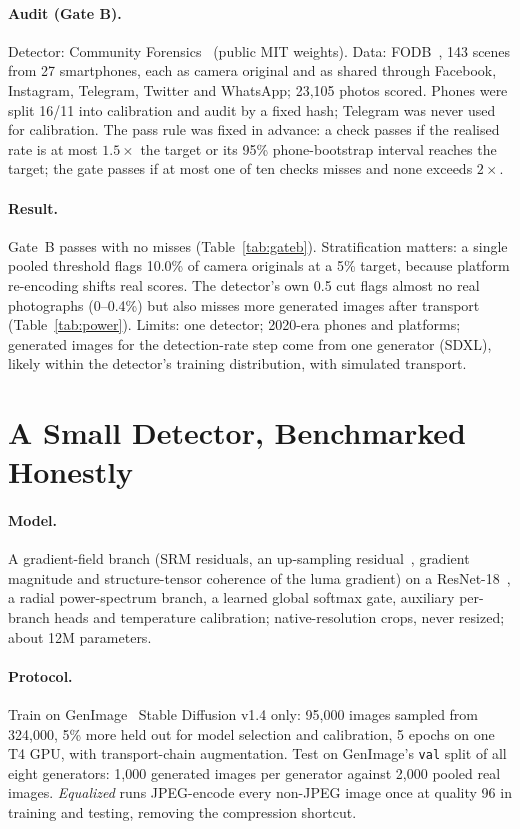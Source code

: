 \documentclass[10pt,twocolumn]{article}
\begin{document}
\paragraph{Audit (Gate B).} Detector: Community Forensics~\cite{park2025community}
(public MIT weights). Data: FODB~\cite{hadwiger2021forchheim}, 143 scenes
from 27 smartphones, each as camera original and as shared through Facebook,
Instagram, Telegram, Twitter and WhatsApp; 23{,}105 photos scored. Phones were
split 16/11 into calibration and audit by a fixed hash; Telegram was never
used for calibration. The pass rule was fixed in advance: a check passes if
the realised rate is at most $1.5\times$ the target or its 95\% phone-bootstrap
interval reaches the target; the gate passes if at most one of ten checks
misses and none exceeds $2\times$.



\paragraph{Result.} Gate~B passes with no misses (Table~\ref{tab:gateb}).
Stratification matters: a single pooled threshold flags 10.0\% of camera
originals at a 5\% target, because platform re-encoding shifts real scores.
The detector's own 0.5 cut flags almost no real photographs (0--0.4\%) but
also misses more generated images after transport (Table~\ref{tab:power}).
Limits: one detector; 2020-era phones and platforms; generated images for the
detection-rate step come from one generator (SDXL), likely within the
detector's training distribution, with simulated transport.



\section{A Small Detector, Benchmarked Honestly}
\label{sec:bench}
\paragraph{Model.} A gradient-field branch (SRM residuals, an up-sampling
residual~\cite{tan2024npr}, gradient magnitude and structure-tensor
coherence of the luma gradient) on a ResNet-18~\cite{he2016resnet}, a radial
power-spectrum branch, a learned global softmax gate, auxiliary per-branch
heads and temperature calibration; native-resolution crops, never resized;
about 12M parameters.

\paragraph{Protocol.} Train on GenImage~\cite{zhu2023genimage} Stable
Diffusion v1.4 only: 95{,}000 images sampled from 324{,}000, 5\% more held out
for model selection and calibration, 5 epochs on one T4 GPU, with
transport-chain augmentation. Test on GenImage's \texttt{val} split of all
eight generators: 1{,}000 generated images per generator against 2{,}000
pooled real images. \emph{Equalized} runs JPEG-encode every non-JPEG image
once at quality 96 in training and testing, removing the compression
shortcut.
\end{document}
